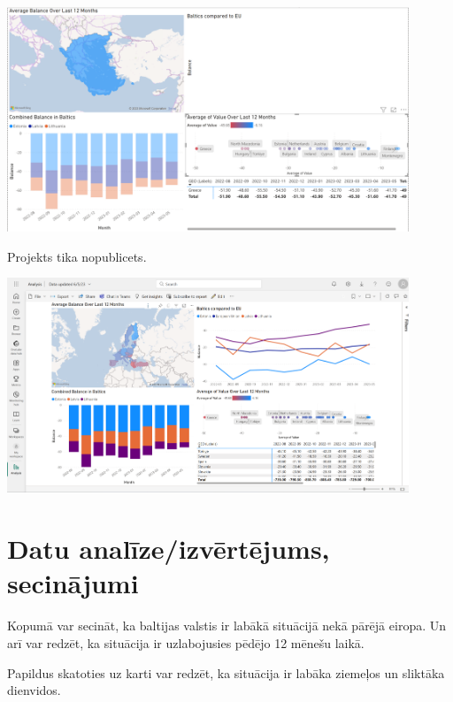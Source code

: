 \documentclass{article}
\begin{document}
\includegraphics[width=0.9\textwidth, center]{Greece}

Projekts tika nopublicets.

\includegraphics[width=0.9\textwidth, center]{Publish}

\section{Datu analīze/izvērtējums, secinājumi}
Kopumā var secināt, ka baltijas valstis ir labākā situācijā nekā pārējā eiropa. Un arī var redzēt, ka situācija ir uzlabojusies pēdējo 12 mēnešu laikā.

Papildus skatoties uz karti var redzēt, ka situācija ir labāka ziemeļos un sliktāka dienvidos.
\end{document}
